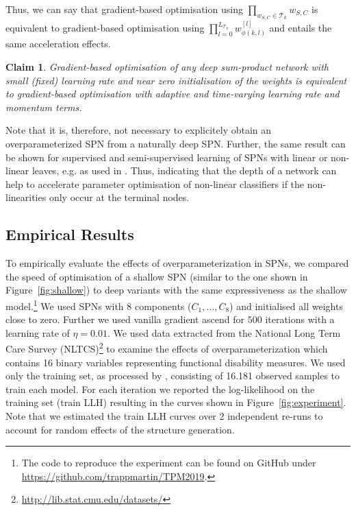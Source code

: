 \documentclass{article}
\newtheorem{claim}{Claim}
\begin{document}
Thus, we can say that gradient-based optimisation using $\prod_{w_{S,C} \in \mathcal{T}_k} w_{S,C}$ is equivalent to gradient-based optimisation using $\prod_{l=0}^{L_{\mathcal{T}_k}} w^{[l]}_{\phi(k, l)}$ and entails the same acceleration effects. 

\begin{claim}
Gradient-based optimisation of any deep sum-product network with small (fixed) learning rate and near zero initialisation of the weights is equivalent to gradient-based optimisation with adaptive and time-varying learning rate and momentum terms.
\end{claim}

Note that it is, therefore, not necessary to explicitely obtain an overparameterized SPN from a naturally deep SPN.
Further, the same result can be shown for supervised and semi-supervised learning of SPNs with linear or non-linear leaves, e.g. as used in \cite{Gens2012,Trapp2017,Peharz2018}.
Thus, indicating that the depth of a network can help to accelerate parameter optimisation of non-linear classifiers if the non-linearities only occur at the terminal nodes.

\subsection{Empirical Results}
To empirically evaluate the effects of overparameterization in SPNs, we compared the speed of optimisation of a shallow SPN (similar to the one shown in Figure~\ref{fig:shallow}) to deep variants with the same expressiveness as the shallow model.\footnote{The code to reproduce the experiment can be found on GitHub under \url{https://github.com/trappmartin/TPM2019}.}
We used SPNs with 8 components ($C_1, \dots, C_8$) and initialised all weights close to zero.
Further we used vanilla gradient ascend for $500$ iterations with a learning rate of $\eta = 0.01$.
We used data extracted from the National Long Term Care Survey (NLTCS)\footnote{\url{http://lib.stat.cmu.edu/datasets/}} to examine the effects of overparameterization which contains 16 binary variables representing functional disability measures. 
We used only the training set, as processed by \cite{Lowd2010}, consisting of 16.181 observed samples to train each model.
For each iteration we reported the log-likelihood on the training set (train LLH) resulting in the curves shown in Figure~\ref{fig:experiment}.
Note that we estimated the train LLH curves over 2 independent re-runs to account for random effects of the structure generation.
\end{document}
